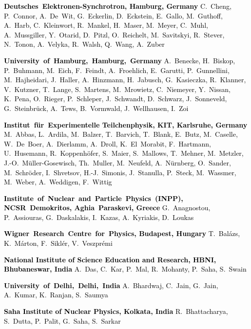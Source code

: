 \textcolor{black}{\textbf{Deutsches~Elektronen-Synchrotron, Hamburg, Germany}\newline
C.~Cheng, P.~Connor, A.~De~Wit, G.~Eckerlin, D.~Eckstein, E.~Gallo, M.~Guthoff, A.~Harb, C.~Kleinwort, R.~Mankel, H.~Maser, M.~Meyer, C.~Muhl, A.~Mussgiller, Y.~Otarid, D.~Pitzl, O.~Reichelt, M.~Savitskyi, R.~Stever, N.~Tonon, A.~Velyka, R.~Walsh, Q.~Wang, A.~Zuber}

\textcolor{black}{\textbf{University~of~Hamburg,~Hamburg,~Germany}\newline
A.~Benecke, H.~Biskop, P.~Buhmann, M.~Eich, F.~Feindt, A.~Froehlich, E.~Garutti, P.~Gunnellini, M.~Hajheidari, J.~Haller, A.~Hinzmann, H.~Jabusch, G.~Kasieczka, R.~Klanner, V.~Kutzner, T.~Lange, S.~Martens, M.~Mrowietz, C.~Niemeyer, Y.~Nissan, K.~Pena,  O.~Rieger, P.~Schleper, J.~Schwandt, D.~Schwarz, J.~Sonneveld, G.~Steinbr\"{u}ck, A.~Tews, B.~Vormwald, J.~Wellhausen, I.~Zoi}

\textcolor{black}{\textbf{Institut~f\"{u}r~Experimentelle Teilchenphysik, KIT, Karlsruhe, Germany}\newline
M.~Abbas, L.~Ardila, M.~Balzer, T.~Barvich, T.~Blank, E.~Butz, M.~Caselle, W.~De~Boer, A.~Dierlamm, A.~Droll, K.~El~Morabit, F.~Hartmann, U.~Husemann, R.~Koppenh\"ofer, S.~Maier, S.~Mallows, T.~Mehner, M.~Metzler, J.-O.~M\"uller-Gosewisch, Th.~Muller, M.~Neufeld, A.~N\"urnberg, O.~Sander, M.~Schr\"oder, I.~Shvetsov, H.-J.~Simonis, J.~Stanulla, P.~Steck, M.~Wassmer, M.~Weber, A.~Weddigen, F.~Wittig}

\textcolor{black}{\textbf{Institute~of~Nuclear~and~Particle~Physics~(INPP), NCSR~Demokritos, Aghia~Paraskevi, Greece}\newline
G.~Anagnostou, P.~Assiouras, G.~Daskalakis, I.~Kazas, A.~Kyriakis, D.~Loukas}

\textcolor{black}{\textbf{Wigner~Research~Centre~for~Physics, Budapest, Hungary}\newline
T.~Bal\'{a}zs, K.~M\'{a}rton, F.~Sikl\'{e}r, V.~Veszpr\'{e}mi}

\textcolor{black}{\textbf{National Institute of Science Education and Research, HBNI, Bhubaneswar, India}\newline
A.~Das, C.~Kar, P.~Mal, R.~Mohanty, P.~Saha, S.~Swain}

\textcolor{black}{\textbf{University~of~Delhi,~Delhi,~India}\newline
A.~Bhardwaj, C.~Jain, G.~Jain, A.~Kumar, K.~Ranjan, S.~Saumya}

\textcolor{black}{\textbf{Saha Institute of Nuclear Physics, Kolkata, India}\newline
R.~Bhattacharya, S.~Dutta, P.~Palit, G.~Saha, S.~Sarkar}

